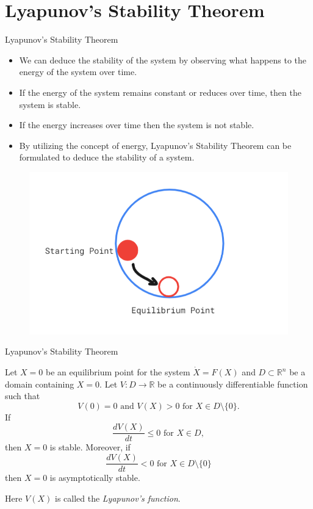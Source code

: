 \documentclass{beamer}
\begin{document}
\section{Lyapunov’s Stability Theorem}
\begin{frame}{Lyapunov’s Stability Theorem}
    \begin{itemize}
        \item We can deduce the stability of the system by observing what happens to the energy of the system over time.
        \item If the energy of the system remains constant or reduces over time, then the system is stable.
        \item If the energy increases over time then the system is not stable. 
        \item By utilizing the concept of energy, Lyapunov’s Stability Theorem can be formulated to deduce the stability of a system.
    \end{itemize}
     
    \begin{figure}[h]
    \centering
    \includegraphics[scale=0.5]{images/ball.png}
    \end{figure}
    
\end{frame}

\begin{frame}{Lyapunov’s Stability Theorem} 

    \begin{theorem}\label{t3}
    Let $X=0$ be an equilibrium point for the system $\dot{X}=F(X)$ and $D \subset \mathbb{R}^n$ be a domain containing $X=0.$ Let $V:D\to \mathbb{R}$ be a continuously differentiable function such that 
    $$V(0)=0 \text{  and  } V(X)>0 \text{  for  } X\in D\setminus \{0\}.$$
    If 
    $$\frac{dV(X)}{dt}\leq 0 \text{  for  } X\in D,$$
    then $X=0$ is stable. Moreover, if
    $$\frac{dV(X)}{dt} < 0 \text{  for  } X\in  D\setminus \{0\}$$
    then $X=0$ is asymptotically stable.
\end{theorem}
Here $V(X)$ is called the \emph{Lyapunov's function}.
\end{frame}
\end{document}
